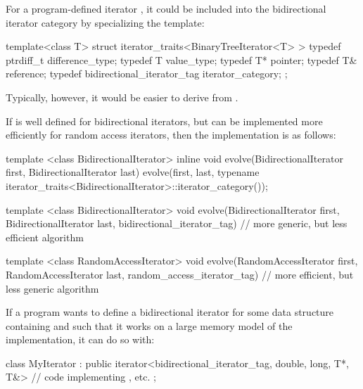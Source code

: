 \pnum
{}%
%
%
%
%
%
\enterexample
For a program-defined iterator
,
it could be included
into the bidirectional iterator category by specializing the
template:

\begin{codeblock}
  template<class T> struct iterator_traits<BinaryTreeIterator<T> > {
    typedef ptrdiff_t difference_type;
    typedef T value_type;
    typedef T* pointer;
    typedef T& reference;
    typedef bidirectional_iterator_tag iterator_category;
  };
\end{codeblock}

Typically, however, it would be easier to derive
from
.
\exitexampleb

\pnum
\enterexample
If
is well defined for bidirectional iterators, but can be implemented more
efficiently for random access iterators, then the implementation is as follows:

\begin{codeblock}
  template <class BidirectionalIterator>
  inline void
   evolve(BidirectionalIterator first, BidirectionalIterator last) {
    evolve(first, last,
     typename iterator_traits<BidirectionalIterator>::iterator_category());
  }

  template <class BidirectionalIterator>
  void evolve(BidirectionalIterator first, BidirectionalIterator last,
              bidirectional_iterator_tag) {
                                // more generic, but less efficient algorithm
  }

  template <class RandomAccessIterator>
  void evolve(RandomAccessIterator first, RandomAccessIterator last,
    random_access_iterator_tag) {
                                // more efficient, but less generic algorithm
  }
\end{codeblock}
\exitexampleb

\pnum
\enterexample
If a \Cpp program wants to define a bidirectional iterator for some data structure containing
and such that it
works on a large memory model of the implementation, it can do so with:

\begin{codeblock}
  class MyIterator :
    public iterator<bidirectional_iterator_tag, double, long, T*, T&> {
                                // code implementing \tcode{++}, etc.
  };
\end{codeblock}

